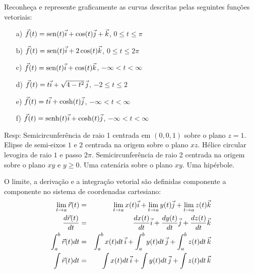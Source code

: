 \begin{exer} Reconheça e represente graficamente as curvas descritas pelas seguintes funções vetoriais:
\begin{itemize}
\item [a)] $\vec{f}(t)=\operatorname{sen}(t)\vec{i}+\cos(t)\vec{j}+\vec{k}$, $0\leq t \leq \pi$
\item [b)] $\vec{f}(t)=\operatorname{sen}(t)\vec{i}+2\cos(t)\vec{k}$, $0\leq t \leq 2\pi$
\item [c)] $\vec{f}(t)=\operatorname{sen}(t)\vec{i}+\cos(t)\vec{k}$, $-\infty < t < \infty$
\item [d)] $\vec{f}(t)=t\vec{i}+\sqrt{4-t^2}~\!\vec{j}$, $-2 \leq t \leq 2$
\item [e)] $\vec{f}(t)=t\vec{i}+\cosh(t)\vec{j}$, $-\infty < t < \infty $
\item [f)] $\vec{f}(t)=\operatorname{senh}(t)\vec{i}+\cosh(t)\vec{j}$, $-\infty < t< \infty $
\end{itemize} 
Resp: Semicircunferência de raio 1 centrada em $(0,0,1)$ sobre o plano $z=1$. Elipse de semi-eixos $1$ e $2$ centrada na origem sobre o plano $xz$. Hélice circular levogira de raio $1$ e passo $2\pi$.  Semicircunferência de raio 2 centrada na origem sobre o plano $xy$ e $y\geq 0$. Uma catenária sobre o plano $xy$. Uma hipérbole. 
\end{exer}

O limite, a derivação e a integração vetorial são definidas componente a componente no sistema de coordenadas cartesiano:
\begin{eqnarray}
\lim_{t\to a}\vec{r}(t)&=&\lim_{t\to a}x(t) \vec{i}+\lim_{t\to a}y(t)\vec{j}+\lim_{t\to a}z(t)\vec{k}\label{deflim}\\
\frac{d\vec{r}(t)}{dt}&=&\frac{d x(t)}{dt}\vec{i}+\frac{d y(t)}{dt}\vec{j}+\frac{d z(t)}{dt}\vec{k}\label{defder}\\
\int_{a}^b\vec{r}(t){dt}&=&\int_{a}^bx(t)dt~\!\vec{i}+\int_{a}^by(t)dt~\!\vec{j}+\int_{a}^bz(t)dt~\!\vec{k}\label{defint}\\
\int\vec{r}(t){dt}&=&\int x(t)dt~\!\vec{i}+\int y(t)dt~\!\vec{j}+\int z(t)dt~\!\vec{k}\label{defint2}
\end{eqnarray}

